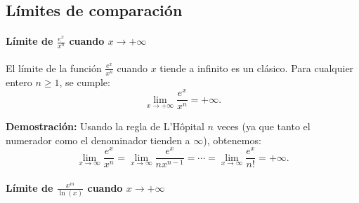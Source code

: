 \documentclass[12pt, a4paper]{article}
\theoremstyle{rioplatense}
\begin{document}
\subsection{Límites de comparación} %



\paragraph{Límite de \( \frac{e^x}{x^n} \) cuando \( x \to +\infty \)}

El límite de la función \( \frac{e^x}{x^n} \) cuando \( x \) tiende a infinito es un clásico. Para cualquier entero \( n \geq 1 \), se cumple:
\[
\lim_{x \to +\infty} \frac{e^x}{x^n} = +\infty.
\]

\begin{flushleft}
\textbf{Demostración:}
Usando la regla de L'Hôpital \( n \) veces (ya que tanto el numerador como el denominador tienden a \( \infty \)), obtenemos:
\[
\lim_{x \to \infty} \frac{e^x}{x^n} = \lim_{x \to \infty} \frac{e^x}{n x^{n-1}} = \cdots = \lim_{x \to \infty} \frac{e^x}{n!} = +\infty.
\]
\end{flushleft}

\begin{center}
\end{center}

\paragraph{Límite de \( \displaystyle \frac{x^m}{\ln(x)} \) cuando \( x \to +\infty \)}
\end{document}
